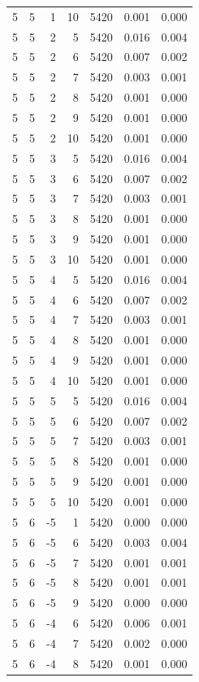 \begin{table}
\begin{tabular}{rrrrrrr}
5 & 5 & 1 & 10 & 5420 & 0.001 & 0.000 \\
5 & 5 & 2 & 5 & 5420 & 0.016 & 0.004 \\
5 & 5 & 2 & 6 & 5420 & 0.007 & 0.002 \\
5 & 5 & 2 & 7 & 5420 & 0.003 & 0.001 \\
5 & 5 & 2 & 8 & 5420 & 0.001 & 0.000 \\
5 & 5 & 2 & 9 & 5420 & 0.001 & 0.000 \\
5 & 5 & 2 & 10 & 5420 & 0.001 & 0.000 \\
5 & 5 & 3 & 5 & 5420 & 0.016 & 0.004 \\
5 & 5 & 3 & 6 & 5420 & 0.007 & 0.002 \\
5 & 5 & 3 & 7 & 5420 & 0.003 & 0.001 \\
5 & 5 & 3 & 8 & 5420 & 0.001 & 0.000 \\
5 & 5 & 3 & 9 & 5420 & 0.001 & 0.000 \\
5 & 5 & 3 & 10 & 5420 & 0.001 & 0.000 \\
5 & 5 & 4 & 5 & 5420 & 0.016 & 0.004 \\
5 & 5 & 4 & 6 & 5420 & 0.007 & 0.002 \\
5 & 5 & 4 & 7 & 5420 & 0.003 & 0.001 \\
5 & 5 & 4 & 8 & 5420 & 0.001 & 0.000 \\
5 & 5 & 4 & 9 & 5420 & 0.001 & 0.000 \\
5 & 5 & 4 & 10 & 5420 & 0.001 & 0.000 \\
5 & 5 & 5 & 5 & 5420 & 0.016 & 0.004 \\
5 & 5 & 5 & 6 & 5420 & 0.007 & 0.002 \\
5 & 5 & 5 & 7 & 5420 & 0.003 & 0.001 \\
5 & 5 & 5 & 8 & 5420 & 0.001 & 0.000 \\
5 & 5 & 5 & 9 & 5420 & 0.001 & 0.000 \\
5 & 5 & 5 & 10 & 5420 & 0.001 & 0.000 \\
5 & 6 & -5 & 1 & 5420 & 0.000 & 0.000 \\
5 & 6 & -5 & 6 & 5420 & 0.003 & 0.004 \\
5 & 6 & -5 & 7 & 5420 & 0.001 & 0.001 \\
5 & 6 & -5 & 8 & 5420 & 0.001 & 0.001 \\
5 & 6 & -5 & 9 & 5420 & 0.000 & 0.000 \\
5 & 6 & -4 & 6 & 5420 & 0.006 & 0.001 \\
5 & 6 & -4 & 7 & 5420 & 0.002 & 0.000 \\
5 & 6 & -4 & 8 & 5420 & 0.001 & 0.000 \\

\end{tabular}
\end{table}
